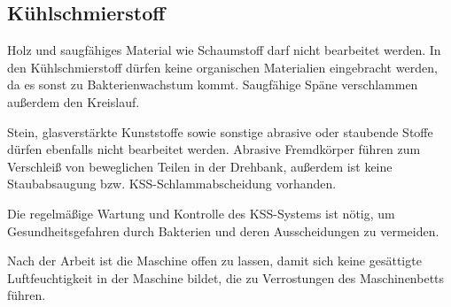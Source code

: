 \documentclass{\basedir/fablab-document}
\begin{document}
\subsection{Kühlschmierstoff}
Holz und saugfähiges Material wie Schaumstoff darf nicht bearbeitet werden. In den Kühlschmierstoff dürfen keine organischen Materialien eingebracht werden, da es sonst zu Bakterienwachstum kommt. Saugfähige Späne verschlammen außerdem den Kreislauf.

Stein, glasverstärkte Kunststoffe sowie sonstige abrasive oder staubende Stoffe dürfen ebenfalls nicht bearbeitet werden. Abrasive Fremdkörper führen zum Verschleiß von beweglichen Teilen in der Drehbank, außerdem ist keine Staubabsaugung bzw. KSS-Schlammabscheidung vorhanden.

Die regelmäßige Wartung und Kontrolle des KSS-Systems ist nötig, um Gesundheitsgefahren durch Bakterien und deren Ausscheidungen zu vermeiden.

Nach der Arbeit ist die Maschine offen zu lassen, damit sich keine gesättigte Luftfeuchtigkeit in der Maschine bildet, die zu Verrostungen des Maschinenbetts führen.

\end{document}

